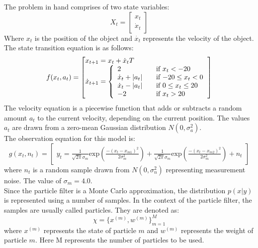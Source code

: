\documentclass[12pt]{article}
\begin{document}
The problem in hand comprises of two state variables:
\begin{equation}
X_t = \begin{bmatrix}
x_t \\
\dot{x}_t
\end{bmatrix}
\label{eq:States}
\end{equation}
Where $x_t$ is the position of the object and $\dot{x_t}$ represents the velocity of the object.\\  

The state transition equation is as follows:
\begin{equation}
f(x_t,a_t) = \begin{bmatrix*}[l]
x_{t+1} = x_t + \dot{x}_t T \\
\dot{x}_{t+1} = \left\{
\begin{array}{l l}
  2 & \quad \text{if $x_t < -20$} \\
  \dot{x}_t + |a_t| & \quad \text{if $-20 \le x_t < 0$} \\
  \dot{x}_t - |a_t| & \quad \text{if $0 \le x_t \le 20$} \\
  -2 & \quad \text{if $x_t > 20$} \\
\end{array} \right.
\end{bmatrix*}
\label{eq:ST}
\end{equation}
The velocity equation is a piecewise function that adds or subtracts a random amount $a_t$ to the current velocity, depending on the current position. The values $a_t$ are drawn from a zero-mean Gaussian distribution $N(0,\sigma_a^2)$.\\

The observation equation for this model is:
\begin{equation}
g(x_t,n_t) = \begin{bmatrix}
y_t = \frac{1}{\sqrt{2 \pi} \sigma_m}
\mathrm{exp} ( \frac{-(x_t - x_{m1})^2}{2 \sigma_m^2} ) +
\frac{1}{\sqrt{2 \pi} \sigma_m}
\mathrm{exp} ( \frac{-(x_t - x_{m2})^2}{2 \sigma_m^2} ) + n_t
\end{bmatrix}
\label{eq:obs}
\end{equation}
where $n_t$ is a random sample drawn from $N(0,\sigma_n^2)$ representing measurement noise. The value of $\sigma_m = 4.0$.\\

Since the particle filter is a Monte Carlo approximation, the distribution
$p(x|y)$ is represented using a number of samples.  In the context of
the particle filter, the samples are usually called particles.
They are denoted as:
\begin{equation}
\chi = \lbrace x^{(m)}, w^{(m)} \rbrace ^M_{m=1}
\end{equation} 
where $x^{(m)}$ represents the state of particle $m$ and
$w^{(m)}$ represents the weight of particle $m$.
Here M represents the number of particles to be used. \\
\end{document}
